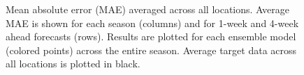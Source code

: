 \documentclass[
  article,
  shortnames,
  notitle]{jss}
\begin{document}
\begin{figure}


\caption{\label{fig-mae-vs-forecast-date}Mean absolute error (MAE)
averaged across all locations. Average MAE is shown for each season
(columns) and for 1-week and 4-week ahead forecasts (rows). Results are
plotted for each ensemble model (colored points) across the entire
season. Average target data across all locations is plotted in black.}

\end{figure}%
\end{document}
